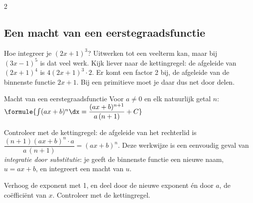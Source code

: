 \begin{alleenvoor}{2}

\begin{oefeningen}
\end{oefeningen}

\subsection{Een macht van een eerstegraadsfunctie}

Hoe integreer je $(2x + 1)^3$? Uitwerken tot een veelterm kan, maar bij $(3x - 1)^5$ is dat veel werk. Kijk liever naar de kettingregel: de afgeleide van $(2x + 1)^4$ is $4(2x + 1)^3 \cdot 2$. Er komt een factor 2 bij, de afgeleide van de binnenste functie $2x + 1$. Bij een primitieve moet je daar dus net door delen.

\begin{theorie}
\begin{stelling}{Macht van een eerstegraadsfunctie}
Voor $a \neq 0$ en elk natuurlijk getal $n$: \qquad $\formule{\int (ax + b)^n\dx = \dfrac{(ax + b)^{n+1}}{a\,(n+1)} + C}$
\end{stelling}
\end{theorie}

Controleer met de kettingregel: de afgeleide van het rechterlid is $\dfrac{(n+1)(ax + b)^n \cdot a}{a\,(n+1)} = (ax + b)^n$. Deze werkwijze is een eenvoudig geval van \emph{integratie door substitutie}: je geeft de binnenste functie een nieuwe naam, $u = ax + b$, en integreert een macht van $u$.


\begin{werkwijze}
Verhoog de exponent met 1, en deel door de nieuwe exponent én door $a$, de coëfficiënt van $x$. Controleer met de kettingregel.
\end{werkwijze}


\begin{oefeningen}
\end{oefeningen}

\end{alleenvoor}
\opdrachtenkop

